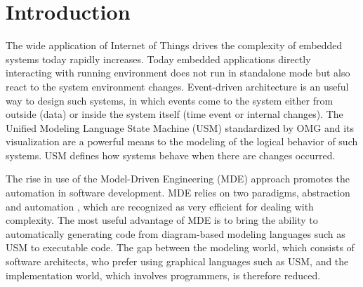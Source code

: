 \section{Introduction}

The wide application of Internet of Things \cite{Li2015} drives the complexity of embedded systems today rapidly increases. 
Today embedded applications directly interacting with running environment does not run in standalone mode but also react to the system environment changes. 
Event-driven architecture \cite{Michelson2006} is an useful way to design such systems, in which events come to the system either from outside (data) or inside the system itself (time event or internal changes). 
The Unified Modeling Language State Machine (USM) \cite{specification_uml_2007} standardized by OMG and its visualization are a powerful means to the modeling of the logical behavior of such systems.   
USM defines how systems behave when there are changes occurred. 

The rise in use of the Model-Driven Engineering (MDE) approach promotes the automation in software development. 
MDE relies on two paradigms, abstraction and automation \cite{Mussbacher2014}, which are recognized as very efficient for dealing with complexity. 
The most useful advantage of MDE is to bring the ability to automatically generating code from diagram-based modeling languages such as USM to executable code.  
The gap between the modeling world, which consists of software architects, who prefer using graphical languages such as USM, and the implementation world, which involves programmers, is therefore reduced. 

